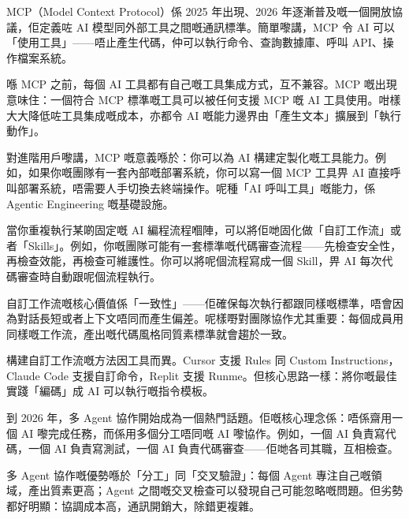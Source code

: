 


MCP（Model Context Protocol）係 2025 年出現、2026 年逐漸普及嘅一個開放協議，佢定義咗 AI 模型同外部工具之間嘅通訊標準。簡單嚟講，MCP 令 AI 可以「使用工具」——唔止產生代碼，仲可以執行命令、查詢數據庫、呼叫 API、操作檔案系統。

喺 MCP 之前，每個 AI 工具都有自己嘅工具集成方式，互不兼容。MCP 嘅出現意味住：一個符合 MCP 標準嘅工具可以被任何支援 MCP 嘅 AI 工具使用。咁樣大大降低咗工具集成嘅成本，亦都令 AI 嘅能力邊界由「產生文本」擴展到「執行動作」。

對進階用戶嚟講，MCP 嘅意義喺於：你可以為 AI 構建定製化嘅工具能力。例如，如果你嘅團隊有一套內部嘅部署系統，你可以寫一個 MCP 工具畀 AI 直接呼叫部署系統，唔需要人手切換去終端操作。呢種「AI 呼叫工具」嘅能力，係 Agentic Engineering 嘅基礎設施。


當你重複執行某啲固定嘅 AI 編程流程嗰陣，可以將佢哋固化做「自訂工作流」或者「Skills」。例如，你嘅團隊可能有一套標準嘅代碼審查流程——先檢查安全性，再檢查效能，再檢查可維護性。你可以將呢個流程寫成一個 Skill，畀 AI 每次代碼審查時自動跟呢個流程執行。

自訂工作流嘅核心價值係「一致性」——佢確保每次執行都跟同樣嘅標準，唔會因為對話長短或者上下文唔同而產生偏差。呢樣嘢對團隊協作尤其重要：每個成員用同樣嘅工作流，產出嘅代碼風格同質素標準就會趨於一致。

構建自訂工作流嘅方法因工具而異。Cursor 支援 Rules 同 Custom Instructions，Claude Code 支援自訂命令，Replit 支援 Runme。但核心思路一樣：將你嘅最佳實踐「編碼」成 AI 可以執行嘅指令模板。


到 2026 年，多 Agent 協作開始成為一個熱門話題。佢嘅核心理念係：唔係齋用一個 AI 嚟完成任務，而係用多個分工唔同嘅 AI 嚟協作。例如，一個 AI 負責寫代碼，一個 AI 負責寫測試，一個 AI 負責代碼審查——佢哋各司其職，互相檢查。

多 Agent 協作嘅優勢喺於「分工」同「交叉驗證」：每個 Agent 專注自己嘅領域，產出質素更高；Agent 之間嘅交叉檢查可以發現自己可能忽略嘅問題。但劣勢都好明顯：協調成本高，通訊開銷大，除錯更複雜。

